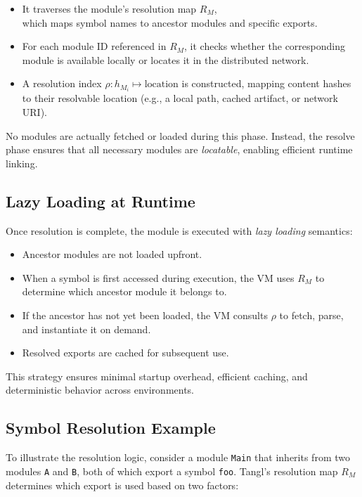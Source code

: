 \documentclass[sigplan,screen]{acmart}
\begin{document}
\begin{itemize}
	\item It traverses the module's resolution map $R_M$, \\which maps symbol names to ancestor modules and specific exports.
	\item For each module ID referenced in $R_M$, it checks whether the corresponding module is available locally or locates it in the distributed network.
	\item A resolution index $\rho: h_{M_i} \mapsto \text{location}$ is constructed, mapping content hashes to their resolvable location (e.g., a local path, cached artifact, or network URI).
\end{itemize}

No modules are actually fetched or loaded during this phase. Instead, the resolve phase ensures that all necessary modules are \textit{locatable}, enabling efficient runtime linking.

\subsection{Lazy Loading at Runtime}

Once resolution is complete, the module is executed with \emph{lazy loading} semantics:

\begin{itemize}
	\item Ancestor modules are not loaded upfront.
	\item When a symbol is first accessed during execution, the VM uses $R_M$ to determine which ancestor module it belongs to.
	\item If the ancestor has not yet been loaded, the VM consults $\rho$ to fetch, parse, and instantiate it on demand.
	\item Resolved exports are cached for subsequent use.
\end{itemize}

This strategy ensures minimal startup overhead, efficient caching, and deterministic behavior across environments.


\subsection{Symbol Resolution Example}

To illustrate the resolution logic, consider a module \texttt{Main} that inherits from two modules \texttt{A} and \texttt{B}, both of which export a symbol \texttt{foo}. Tangl's resolution map $R_M$ determines which export is used based on two factors:
\end{document}
